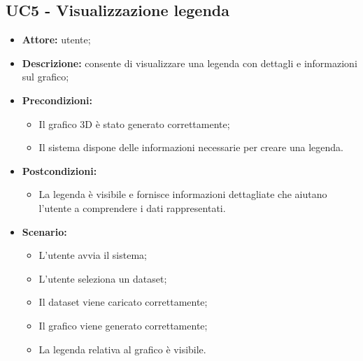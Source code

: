 \subsection{UC5 - Visualizzazione legenda}
\begin{itemize}
    \item \textbf{Attore:} utente;
    \item \textbf{Descrizione:} consente di visualizzare una legenda con dettagli e informazioni sul grafico;
    \item \textbf{Precondizioni:} 
    \begin{itemize}
        \item Il grafico 3D è stato generato correttamente;
        \item Il sistema dispone delle informazioni necessarie per creare una legenda.
    \end{itemize}
    \item \textbf{Postcondizioni:}
    \begin{itemize}
        \item La legenda è visibile e fornisce informazioni dettagliate che aiutano l'utente a comprendere i dati rappresentati.
    \end{itemize}
    \item \textbf{Scenario:} 
    \begin{itemize}
        \item L'utente avvia il sistema;
        \item L'utente seleziona un dataset;
        \item Il dataset viene caricato correttamente;
        \item Il grafico viene generato correttamente;
        \item La legenda relativa al grafico è visibile.
    \end{itemize}
\end{itemize}
\newpage
